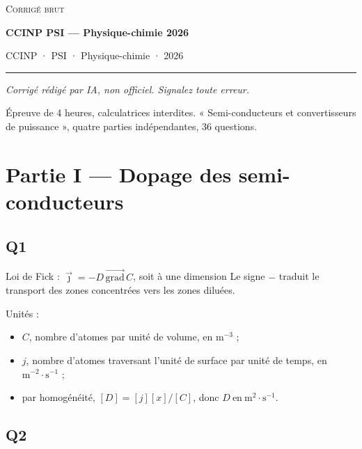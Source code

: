 \documentclass[11pt,a4paper]{article}
\providecommand{\tightlist}{\setlength{\itemsep}{0pt}\setlength{\parskip}{0pt}}
\newcommand{\equationajustee}[1]{%
  \sbox{\boiteequation}{$\displaystyle #1$}%
  \ifdim\wd\boiteequation>\linewidth
    \[\resizebox{\linewidth}{!}{\usebox{\boiteequation}}\]%
  \else
    \[#1\]%
  \fi}
\begin{document}
\thispagestyle{plain}
\begin{center}
  {\small\scshape Corrigé brut}\par\smallskip
  {\LARGE\bfseries CCINP PSI — Physique-chimie 2026\par}\medskip
  {\large CCINP · PSI · Physique-chimie · 2026\par}
\end{center}
\vspace{2pt}\hrule\vspace{8pt}

\emph{Corrigé rédigé par IA, non officiel. Signalez toute erreur.}

Épreuve de 4 heures, calculatrices interdites. « Semi-conducteurs et convertisseurs de puissance », quatre parties indépendantes, 36 questions.

\hypertarget{partie-i-dopage-des-semi-conducteurs}{%
\section{Partie I --- Dopage des semi-conducteurs}\label{partie-i-dopage-des-semi-conducteurs}}

\hypertarget{q1}{%
\subsection{Q1}\label{q1}}

Loi de Fick : \(\vec\jmath=-D\,\overrightarrow{\mathrm{grad}}\,C\), soit à une dimension
\equationajustee{\boxed{j(x,t)=-D\,\frac{\partial C}{\partial x}(x,t)}}
Le signe \(-\) traduit le transport des zones concentrées vers les zones diluées.

Unités :

\begin{itemize}
\tightlist
\item
  \(C\), nombre d'atomes par unité de volume, en \(\mathrm{m^{-3}}\) ;
\item
  \(j\), nombre d'atomes traversant l'unité de surface par unité de temps, en \(\mathrm{m^{-2}\cdot s^{-1}}\) ;
\item
  par homogénéité, \([D]=[j][x]/[C]\), donc \(\boxed{D\ \text{en}\ \mathrm{m^2\cdot s^{-1}}}\).
\end{itemize}

\hypertarget{q2}{%
\subsection{Q2}\label{q2}}
\end{document}

